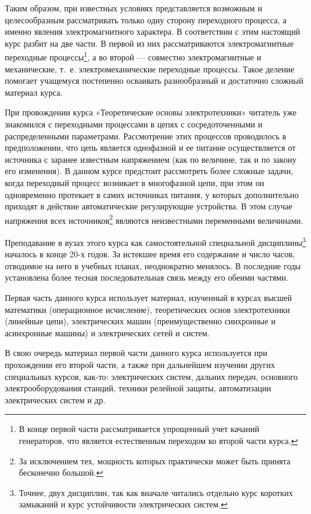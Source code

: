 Таким образом, при известных условиях представляется возможным и целесообразным рассматривать только одну   сторону переходного процесса, а именно явления электромагнитного характера. В  соответствии с этим настоящий курс разбит на две части. В первой из них рассматриваются электромагнитные переходные процессы\footnote{В конце первой части рассматривается упрощенный учет качаний генераторов, что является естественным переходом ко второй части курса.}, а во второй --- совместно электромагнитные и механические, т.~е. электромеханические переходные процессы. Такое деление помогает учащемуся постепенно осваивать разнообразный и достаточно сложный материал курса.

При провождении курса «Теоретические основы электротехники» читатель уже знакомился с переходными процессами в цепях с сосредоточенными и распределенными параметрами. Рассмотрение этих процессов проводилось в предположении, что цепь является однофазной и ее питание осуществляется от источника с заранее известным напряжением (как по величине, так и по закону его изменения). В данном курсе предстоит рассмотреть более сложные задачи, когда переходный процесс возникает в многофазной цепи, при этом он одновременно протекает в самих источниках питания, у которых дополнительно приходят в действие автоматические регулирующие устройства. В этом случае напряжения всех источников\footnote{За исключением тех, мощность которых практически может быть принята бесконечно большой.} являются неизвестными переменными величинами.

Преподавание в вузах этого курса как самостоятельной специальной дисциплины\footnote{Точнее, двух дисциплин,  так как вначале читались отдельно курс коротких замыканий и курс устойчивости электрических систем.} началось в конце 20-х годов. За истекшее время его содержание и число часов, отводимое на него в учебных планах, неоднократно менялось. В последние годы установлена более тесная последовательная связь между его обеими частями.

Первая часть данного курса использует материал, изученный в курсах высшей математики (операционное исчисление), теоретических основ электротехники (линейные цепи), электрических машин (преимущественно синхронные и асинхронные машины) и электрических сетей и систем.

В свою очередь материал первой части данного курса используется при прохождении его второй части, а также при дальнейшем изучении других специальных курсов, как-то: электрических систем, дальних передач, основного электрооборудования станций, техники релейной защиты, автоматизации электрических систем и др.

